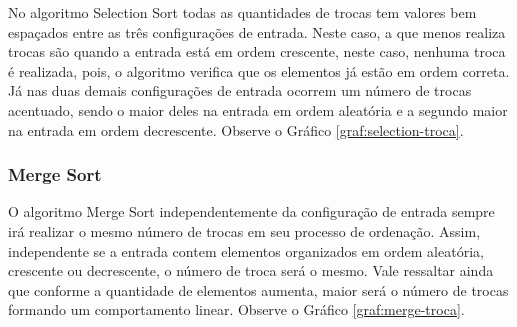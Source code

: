 \documentclass[conference]{IEEEtran}
\begin{document}
No algoritmo Selection Sort todas as quantidades de trocas tem valores bem espaçados entre as três configurações de entrada. Neste caso, a que menos realiza trocas são quando a entrada está em ordem crescente, neste caso, nenhuma troca é realizada, pois, o algoritmo verifica que os elementos já estão em ordem correta. Já nas duas demais configurações de entrada ocorrem um número de trocas acentuado, sendo o maior deles na entrada em ordem aleatória e a segundo maior na entrada em ordem decrescente. Observe o Gráfico \ref{graf:selection-troca}.

\begin{center}
\end{center}

\subsubsection{Merge Sort}

O algoritmo Merge Sort independentemente da configuração de entrada sempre irá realizar o mesmo número de trocas em seu processo de ordenação. Assim, independente se a entrada contem elementos organizados em ordem aleatória, crescente ou decrescente, o número de troca será o mesmo. Vale ressaltar ainda que conforme a quantidade de elementos aumenta, maior será o número de trocas formando um comportamento linear. Observe o Gráfico \ref{graf:merge-troca}.

\begin{center}
\end{center}
\end{document}
